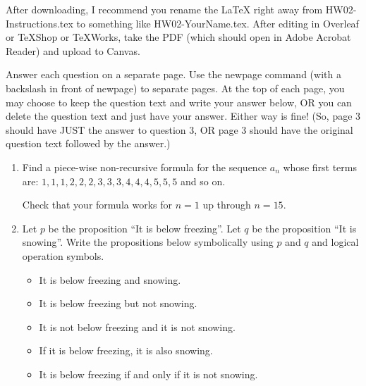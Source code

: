 \documentclass{article}
\begin{document}
After downloading, I recommend you rename the LaTeX right away from HW02-Instructions.tex to something like HW02-YourName.tex. After editing in Overleaf or TeXShop or TeXWorks, take the PDF (which should open in Adobe Acrobat Reader) and upload to Canvas.

Answer each question on a separate page. Use the newpage command (with a backslash in front of newpage) to separate pages. At the top of each page, you may choose to keep the question text and write your answer below, OR you can delete the question text and just have your answer. Either way is fine! (So, page 3 should have JUST the answer to question 3, OR page 3 should have the original question text followed by the answer.)

\begin{enumerate}

\item 
Find a piece-wise non-recursive formula for the sequence $a_n$ whose first terms are: $1,1,1,2,2,2,3,3,3,4,4,4,5,5,5$ and so on.

Check that your formula works for $n=1$ up through $n=15$.

\item Let $p$ be the proposition ``It is below freezing''. Let $q$ be the proposition ``It is snowing''. Write the propositions below symbolically using $p$ and $q$ and logical operation symbols.
\begin{itemize}
\item It is below freezing and snowing.
\item It is below freezing but not snowing.
\item It is not below freezing and it is not snowing.
\item If it is below freezing, it is also snowing.
\item It is below freezing if and only if it is not snowing.
\end{itemize}


\end{enumerate}
\end{document}
